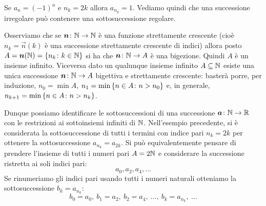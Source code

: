 \begin{example}
Se $a_n = (-1)^n$ e $n_k=2k$ allora $a_{n_k} = 1$.
Vediamo quindi che una successione irregolare
può contenere una sottosuccessione regolare.
\end{example}

Osserviamo che se $\boldsymbol n\colon {\mathbb N}\to {\mathbb N}$ è una
funzione strettamente crescente
(cioè $n_k=\vec n(k)$ è una successione strettamente crescente di indici)
allora posto $A=\boldsymbol n({\mathbb N})={\left\{ n_k\colon k\in {\mathbb N} \right\}}$ si ha che
$\boldsymbol n \colon {\mathbb N} \to A$ è una bigezione. Quindi $A$ è un insieme infinito.
Viceversa dato un qualunque insieme infinito $A\subseteq {\mathbb N}$ esiste una
unica successione $\boldsymbol n\colon {\mathbb N} \to A$ bigettiva e strettamente crescente:
basterà porre, per induzione,
$n_0 = \min A$, $n_1 = \min {\left\{ n\in A \colon n > n_0 \right\}}$
e, in generale,
 $n_{k+1} = \min{\left\{  n\in A \colon n > n_k \right\}}$.

Dunque possiamo identificare le sottosuccessioni di una successione
$\boldsymbol a \colon {\mathbb N} \to {\mathbb R}$ con le restrizioni ai sottoinsiemi infiniti di ${\mathbb N}$.
Nell'esempio precedente, si è considerata la sottosuccessione
di tutti i termini con indice pari $n_k=2k$ per ottenere la sottosuccessione
$a_{n_k} = a_{2k}$. Si può equivalentemente pensare di prendere l'insieme di
tutti i numeri pari $A=2{\mathbb N}$ e considerare la successione ristretta ai soli
indici pari:
\[
  a_0, a_2, a_4, \dots
\]
Se rinumeriamo gli indici pari usando tutti i numeri naturali otteniamo
la sottosuccessione $b_k=a_{n_k}$:
\[
  b_0 = a_0,\ b_1 = a_2,\ b_2 = a_4,\ \dots,\ b_k = a_{n_k},\ \dots
\]

